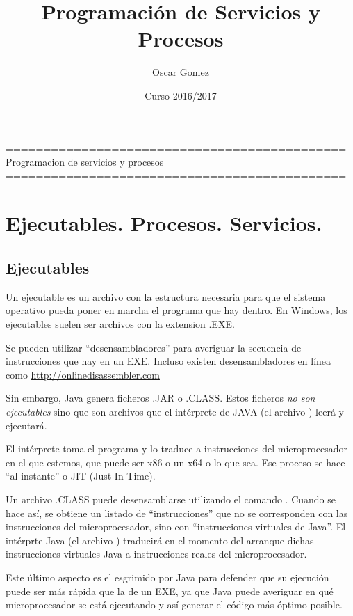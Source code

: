 \documentclass[a4paper,12pt,spanish]{sphinxmanual}
\title{Programación de Servicios y Procesos}
\date{Curso 2016/2017}
\author{Oscar Gomez}
\begin{document}
\maketitle
\tableofcontents
{}\label{index::doc}
{}=============================================
Programacion de servicios y procesos
=============================================




\chapter{Ejecutables. Procesos. Servicios.}
\label{textos/tema1:ejecutables-procesos-servicios}\label{textos/tema1::doc}\label{textos/tema1:programacion-multiproceso}

\section{Ejecutables}
\label{textos/tema1:ejecutables}
Un ejecutable es un archivo con la estructura necesaria para que el sistema operativo pueda poner en marcha el programa que hay dentro. En Windows, los ejecutables suelen ser archivos con la extension .EXE.

Se pueden utilizar ``desensambladores'' para averiguar la secuencia de instrucciones que hay en un EXE. Incluso existen desensambladores en línea como \url{http://onlinedisassembler.com}

Sin embargo, Java genera ficheros .JAR o .CLASS. Estos ficheros \emph{no son ejecutables} sino que son archivos que el intérprete de JAVA (el archivo ) leerá y ejecutará.

El intérprete toma el programa y lo traduce a instrucciones del microprocesador en el que estemos, que puede ser x86 o un x64 o lo que sea. Ese proceso se hace ``al instante'' o JIT (Just-In-Time).

Un archivo .CLASS puede desensamblarse utilizando el comando  . Cuando se hace así, se obtiene un listado de ``instrucciones'' que no se corresponden con las instrucciones del microprocesador, sino con ``instrucciones virtuales de Java''. El intérprte Java (el archivo ) traducirá en el momento del arranque dichas instrucciones virtuales Java a instrucciones reales del microprocesador.

Este último aspecto es el esgrimido por Java para defender que su ejecución puede ser más rápida que la de un EXE, ya que Java puede averiguar en qué microprocesador se está ejecutando y así generar el código más óptimo posible.
\end{document}
